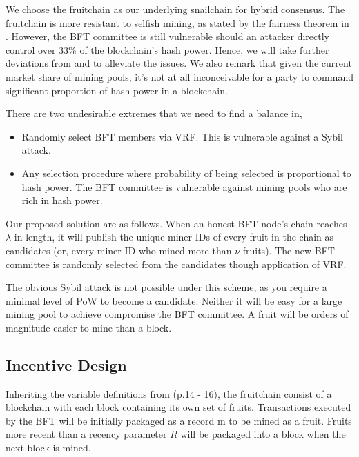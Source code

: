 We choose the fruitchain\cite{pass2017fruit} as our underlying snailchain for hybrid consensus. The fruitchain is more resistant to selfish mining, as stated by the fairness theorem in \cite{pass2017fruit}. However, the BFT committee is still vulnerable should an attacker directly control over 33\% of the blockchain's hash power. Hence, we will take further deviations from \cite{pass2017hybrid} and \cite{pass2017fruit} to alleviate the issues. We also remark that given the current market share of mining pools, it's not at all inconceivable for a party to command significant proportion of hash power in a blockchain. 

There are two undesirable extremes that we need to find a balance in, 
\begin{itemize}
	\item Randomly select BFT members via VRF\cite{micali1999verifiable}. This is vulnerable against a Sybil attack.
	\newline
	\item Any selection procedure where probability of being selected is proportional to hash power. The BFT committee is vulnerable against mining pools who are rich in hash power. 
\end{itemize} 


Our proposed solution are as follows. When an honest BFT node's chain reaches $\lambda$ in length, it will publish the unique miner IDs of every fruit in the chain as candidates (or, every miner ID who mined more than $\nu$ fruits). The new BFT committee is randomly selected from the candidates though application of VRF.  

The obvious Sybil attack is not possible under this scheme, as you require a minimal level of PoW to become a candidate. Neither it will be easy for a large mining pool to achieve compromise the BFT committee. A fruit will be orders of magnitude easier to mine than a block. 


\subsection{Incentive Design}

Inheriting the variable definitions from \cite{pass2017fruit} (p.14 - 16), the fruitchain consist of a blockchain with each block containing its own set of fruits. Transactions executed by the BFT will be initially packaged as a record $\mathrm{m}$ to be mined as a fruit. Fruits more recent than a recency parameter $R$ will be packaged into a block when the next block is mined. 

